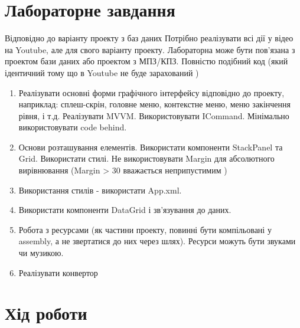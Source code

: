 \documentclass[14pt]{extreport}
\begin{document}
\begin{normalsize}
	\section*{Лабораторне завдання}
	Відповідно до варіанту проекту з баз даних 
	Потрібно реалізувати всі дії у відео на Youtube, але для свого варіанту проекту. Лабораторна може бути пов’язана з проектом бази даних або проектом з МПЗ/КПЗ. Повністю подібний код (який ідентичний тому що в Youtube не буде зарахований )
	
	\begin{enumerate}
		\item Реалізувати основні форми графічного інтерфейсу відповідно до проекту, наприклад: сплеш-скрін, головне меню, контекстне меню, меню закінчення рівня, і т.д.
		Реалізувати MVVM. Використовувати ICommand. Мінімально використовувати code behind.
		\item Основи розташування елементів. Використати компоненти StackPanel та Grid. Використати стилі. Не використовувати Margin для абсолютного вирівнювання (Margin > 30 вважається неприпустимим )
		\item Використання стилів - використати App.xml. 
		\item Використати компоненти DataGrid і зв’язування до даних. 
		\item Робота з ресурсами (як частини проекту, повинні бути компільовані у assembly, а не звертатися до них через шлях). Ресурси можуть бути звуками чи музикою. 
		\item Реалізувати конвертор
	\end{enumerate}
	
	
	\section*{Хід роботи}
	
	\begin{small}
		\begin{lstlisting}
		\end{lstlisting}
	\end{small}
	

\end{normalsize}
\end{document}
